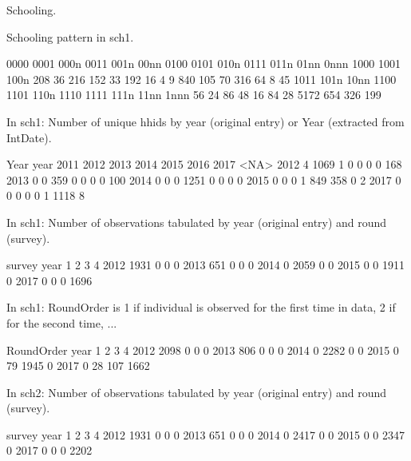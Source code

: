 Schooling. \gobblepars

Schooling pattern in sch1.
\begin{Schunk}
\begin{Soutput}

0000 0001 000n 0011 001n 00nn 0100 0101 010n 0111 011n 01nn 0nnn 1000 1001 100n 
 208   36  216  152   33  192   16    4    9  840  105   70  316   64    8   45 
1011 101n 10nn 1100 1101 110n 1110 1111 111n 11nn 1nnn 
  56   24   86   48   16   84   28 5172  654  326  199 
\end{Soutput}
\end{Schunk}



In \textsf{sch1}: Number of unique \textsf{hhid}s by \textsf{year} (original entry) or \textsf{Year} (extracted from \textsf{IntDate}).
\begin{Schunk}
\begin{Soutput}
      Year
year   2011 2012 2013 2014 2015 2016 2017 <NA>
  2012    4 1069    1    0    0    0    0  168
  2013    0    0  359    0    0    0    0  100
  2014    0    0    0 1251    0    0    0    0
  2015    0    0    0    1  849  358    0    2
  2017    0    0    0    0    0    1 1118    8
\end{Soutput}
\end{Schunk}
In \textsf{sch1}: Number of observations tabulated by \textsf{year} (original entry) and round (\textsf{survey}).
\begin{Schunk}
\begin{Soutput}
      survey
year      1    2    3    4
  2012 1931    0    0    0
  2013  651    0    0    0
  2014    0 2059    0    0
  2015    0    0 1911    0
  2017    0    0    0 1696
\end{Soutput}
\end{Schunk}
In \textsf{sch1}: RoundOrder is 1 if individual is observed for the first time in data, 2 if for the second time, ...
\begin{Schunk}
\begin{Soutput}
      RoundOrder
year      1    2    3    4
  2012 2098    0    0    0
  2013  806    0    0    0
  2014    0 2282    0    0
  2015    0   79 1945    0
  2017    0   28  107 1662
\end{Soutput}
\end{Schunk}
In \textsf{sch2}: Number of observations tabulated by \textsf{year} (original entry) and round (\textsf{survey}).
\begin{Schunk}
\begin{Soutput}
      survey
year      1    2    3    4
  2012 1931    0    0    0
  2013  651    0    0    0
  2014    0 2417    0    0
  2015    0    0 2347    0
  2017    0    0    0 2202
\end{Soutput}
\end{Schunk}
